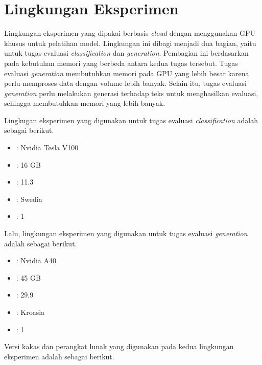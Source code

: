 \section{Lingkungan Eksperimen}

Lingkungan eksperimen yang dipakai berbasis \textit{cloud} dengan menggunakan GPU khusus untuk pelatihan model. Lingkungan ini dibagi menjadi dua bagian, yaitu untuk tugas evaluasi \textit{classification} dan \textit{generation}. Pembagian ini berdasarkan pada kebutuhan memori yang berbeda antara kedua tugas tersebut. Tugas evaluasi \textit{generation} membutuhkan memori pada GPU yang lebih besar karena perlu memproses data dengan volume lebih banyak. Selain itu, tugas evaluasi \textit{generation} perlu melakukan generasi terhadap teks untuk menghasilkan evaluasi, sehingga membutuhkan memori yang lebih banyak.

Lingkugan eksperimen yang digunakan untuk tugas evaluasi \textit{classification} adalah sebagai berikut.

\begin{itemize}
    \item {} : Nvidia Tesla V100
    \item {} : 16 GB
    \item {} : 11.3
    \item {} : Swedia
    \item {} : 1
\end{itemize}

Lalu, lingkungan eksperimen yang digunakan untuk tugas evaluasi \textit{generation} adalah sebagai berikut.

\begin{itemize}
    \item {} : Nvidia A40
    \item {} : 45 GB
    \item {} : 29.9
    \item {} : Kroasia
    \item {} : 1
\end{itemize}

Versi kakas dan perangkat lunak yang digunakan pada kedua lingkungan eksperimen adalah sebagai berikut.

